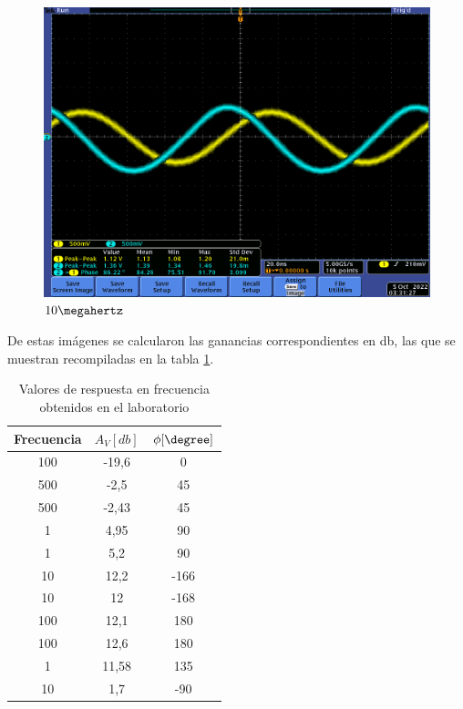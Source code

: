 \documentclass[12pt,letterpaper]{article}     %
\begin{document}
{\begin{figure}[!ht]
\centering
\includegraphics[scale=0.5]{imagenes/18.png}
\caption{$10\megahertz$}
\label{fig:18}
\end{figure}

\clearpage
De estas imágenes se calcularon las ganancias correspondientes en db,
las que se muestran recompiladas en la tabla \ref{tab:RespuestaEnFrecuencia}.

\begin{table}[!ht]
	\begin{center}
		\begin{tabular}{| c | c | c |}
			\hline
			\textbf{Frecuencia} & \textbf{$A_V[db]$} & \textbf{$\phi[\degree]$}\\ 
			\hline
			{100\hertz} & {-19,6}  & {0}\\
			\hline
			{500\hertz} & {-2,5}  & {45}\\
			\hline
			{500\hertz} & {-2,43}  & {45}\\
			\hline
			{1\kilohertz} & {4,95}  & {90}\\
			\hline
			{1\kilohertz} & {5,2}  & {90}\\
			\hline
			{10\kilohertz} & {12,2}  & {-166}\\
			\hline
			{10\kilohertz} & {12}  & {-168}\\
			\hline
			{100\kilohertz} & {12,1}  & {180}\\
			\hline
			{100\kilohertz} & {12,6}  & {180}\\
			\hline
			{1\megahertz} & {11,58}  & {135}\\
			\hline
			{10\megahertz} & {1,7}  & {-90}\\
			\hline
		\end{tabular}
	\end{center}
\caption{Valores de respuesta en frecuencia obtenidos en el laboratorio}
\label{tab:RespuestaEnFrecuencia}
\end{table}

}
\end{document}
